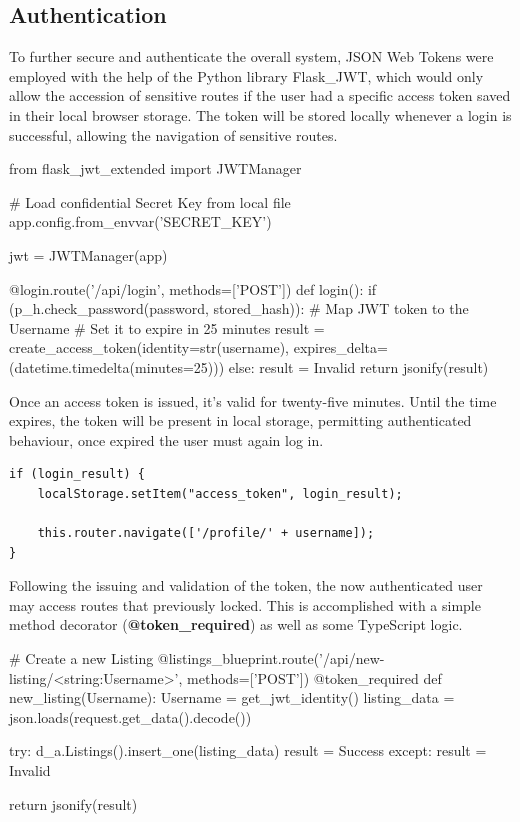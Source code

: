 \subsection{Authentication}
To further secure and authenticate the overall system, JSON Web Tokens were employed with the help of the Python library Flask\_JWT, which would only allow the accession of sensitive routes if the user had a specific access token saved in their local browser storage. The token will be stored locally whenever a login is successful, allowing the navigation of sensitive routes.  \newline

\begin{python}[caption=Issuing a limited JWT Token ]
from flask_jwt_extended import JWTManager

# Load confidential Secret Key from local file
app.config.from_envvar('SECRET_KEY')

jwt = JWTManager(app)

@login.route('/api/login', methods=['POST'])
def login():
    if (p_h.check_password(password, stored_hash)): 
        # Map JWT token to the Username
        # Set it to expire in 25 minutes
        result = create_access_token(identity=str(username), expires_delta=(datetime.timedelta(minutes=25)))
    else:
        result = Invalid
    return jsonify(result)
\end{python}
      
\newpage
Once an access token is issued, it's valid for twenty-five minutes. Until the time expires, the token will be present in local storage, permitting authenticated behaviour, once expired the user must again log in.

\begin{lstlisting}[caption=Storing the Authentication Token]
if (login_result) {
    localStorage.setItem("access_token", login_result);
    
    this.router.navigate(['/profile/' + username]);
}
\end{lstlisting}

Following the issuing and validation of the token, the now authenticated user may access routes that previously locked. This is accomplished with a simple method decorator (\textbf{@token\_required}) as well as some TypeScript logic. \newline

\begin{python}[caption=Issuing a limited JWT Token]
# Create a new Listing
@listings_blueprint.route('/api/new-listing/<string:Username>', methods=['POST'])
@token_required
def new_listing(Username):
    Username = get_jwt_identity()
    listing_data = json.loads(request.get_data().decode())
   
    try: 
        d_a.Listings().insert_one(listing_data) 
        result = Success
    except:
        result = Invalid
    
    return jsonify(result)
\end{python}

